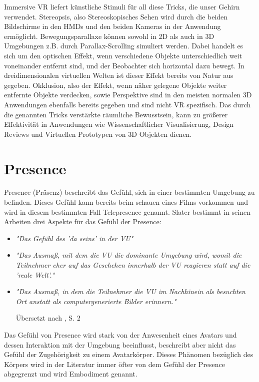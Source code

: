Immersive VR liefert künstliche Stimuli für all diese Tricks, die unser Gehirn verwendet. Stereopsis, also Stereoskopisches Sehen wird durch die beiden Bildschirme in den HMDs und den beiden Kameras in der Anwendung ermöglicht. Bewegungsparallaxe können sowohl in 2D als auch in 3D Umgebungen z.B. durch Parallax-Scrolling simuliert werden. Dabei handelt es sich um den optischen Effekt, wenn verschiedene Objekte unterschiedlich weit voneinander entfernt sind, und der Beobachter sich horizontal dazu bewegt. In dreidimensionalen virtuellen Welten ist dieser Effekt bereits von Natur aus gegeben. Okklusion, also der Effekt, wenn näher gelegene Objekte weiter entfernte Objekte verdecken, sowie Perspektive sind in den meisten normalen 3D Anwendungen ebenfalls bereits gegeben und sind nicht VR spezifisch.
Das durch die genannten Tricks verstärkte räumliche Bewusstsein, kann zu größerer Effektivität in Anwendungen wie Wissenschaftlicher Visualisierung, Design Reviews und Virtuellen Prototypen von 3D Objekten dienen.

\section{Presence}
Presence (Präsenz) beschreibt das Gefühl, sich in einer bestimmten Umgebung zu befinden. Dieses Gefühl kann bereits beim schauen eines Films vorkommen und wird in diesem bestimmten Fall Telepresence genannt.
Slater bestimmt in seinen Arbeiten \cite{Slater2003}\cite{Slater1999} drei Aspekte für das Gefühl der Presence:

\begin{itemize}

\item \textit{"Das Gefühl des 'da seins' in der VU"}
\item \textit{"Das Ausmaß, mit dem die VU die dominante Umgebung wird, womit die Teilnehmer eher auf das Geschehen innerhalb der VU reagieren statt auf die 'reale Welt'."}
\item \textit{"Das Ausmaß, in dem die Teilnehmer die VU im Nachhinein als besuchten Ort anstatt als computergenerierte Bilder erinnern."}

Übersetzt nach \cite{Slater1999}, S. 2
\end{itemize}

Das Gefühl von Presence wird stark von der Anwesenheit eines Avatars und dessen Interaktion mit der Umgebung beeinflusst, beschreibt aber nicht das Gefühl der Zugehörigkeit zu einem Avatarkörper. Dieses Phänomen bezüglich des Körpers wird in der Literatur immer öfter von dem Gefühl der Presence abgegrenzt und wird Embodiment genannt.

